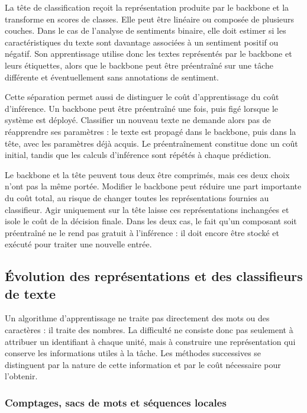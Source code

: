La tête de classification reçoit la représentation produite par le backbone et
la transforme en scores de classes. Elle peut être linéaire ou composée de
plusieurs couches. Dans le cas de l'analyse de sentiments binaire, elle doit
estimer si les caractéristiques du texte sont davantage associées à un
sentiment positif ou négatif. Son apprentissage utilise donc les textes
représentés par le backbone et leurs étiquettes, alors que le backbone peut être
préentraîné sur une tâche différente et éventuellement sans annotations de
sentiment.

Cette séparation permet aussi de distinguer le coût d'apprentissage du coût
d'inférence. Un backbone peut être préentraîné une fois, puis figé lorsque le
système est déployé. Classifier un nouveau texte ne demande alors pas de
réapprendre ses paramètres : le texte est propagé dans le backbone, puis dans
la tête, avec les paramètres déjà acquis. Le préentraînement constitue donc un
coût initial, tandis que les calculs d'inférence sont répétés à chaque
prédiction.

Le backbone et la tête peuvent tous deux être comprimés, mais ces deux choix
n'ont pas la même portée. Modifier le backbone peut réduire une part importante
du coût total, au risque de changer toutes les représentations fournies au
classifieur. Agir uniquement sur la tête laisse ces représentations inchangées
et isole le coût de la décision finale. Dans les deux cas, le fait qu'un
composant soit préentraîné ne le rend pas gratuit à l'inférence : il doit encore
être stocké et exécuté pour traiter une nouvelle entrée.

\subsection{Évolution des représentations et des classifieurs de texte}
\label{ssec:etat_art_representations}

Un algorithme d'apprentissage ne traite pas directement des mots ou des
caractères : il traite des nombres. La difficulté ne consiste donc pas seulement
à attribuer un identifiant à chaque unité, mais à construire une représentation
qui conserve les informations utiles à la tâche. Les méthodes successives se
distinguent par la nature de cette information et par le coût nécessaire pour
l'obtenir.

\subsubsection{Comptages, sacs de mots et séquences locales}

